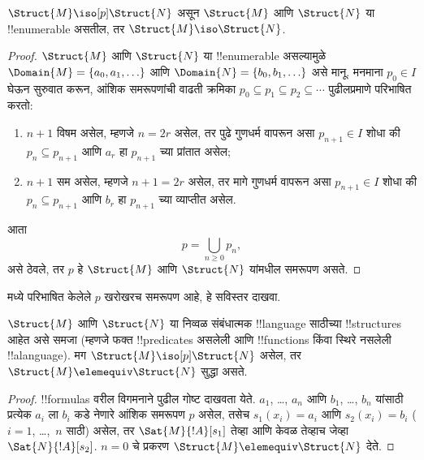 \documentclass[../../../include/open-logic-section]{subfiles}
\begin{document}
\begin{thm}
  $\Struct{M} \iso[p] \Struct{N}$ असून $\Struct{M}$ आणि
  $\Struct{N}$ या !!{enumerable} असतील, तर $\Struct{M} \iso
  \Struct{N}$.
\end{thm}

\begin{proof}
  $\Struct{M}$ आणि $\Struct{N}$ या !!{enumerable} असल्यामुळे
  $\Domain{M} = \{a_0, a_1, \ldots \}$ आणि $\Domain{N} = \{b_0, b_1,
  \ldots \}$ असे मानू. मनमाना $p_0 \in I$ घेऊन सुरुवात करून, आंशिक
  समरूपणांची वाढती क्रमिका $p_0 \subseteq p_1 \subseteq p_2
  \subseteq \cdots$ पुढीलप्रमाणे परिभाषित करतो:
  \begin{enumerate}
  \item $n+1$ विषम असेल, म्हणजे $n = 2r$ असेल, तर पुढे गुणधर्म वापरून
    असा $p_{n+1} \in I$ शोधा की $p_n \subseteq p_{n+1}$
    आणि $a_r$ हा $p_{n+1}$ च्या प्रांतात असेल;
  \item $n+1$ सम असेल, म्हणजे $n+1 =2r$ असेल, तर मागे गुणधर्म वापरून
    असा $p_{n+1} \in I$ शोधा की $p_n \subseteq p_{n+1}$
    आणि $b_r$ हा $p_{n+1}$ च्या व्याप्तीत असेल.
  \end{enumerate}
आता
\[
p = \bigcup_{n\ge 0} p_n,
\]
असे ठेवले, तर $p$ हे $\Struct{M}$ आणि $\Struct{N}$ यांमधील समरूपण
असते.
\end{proof}

\begin{prob}
   मध्ये परिभाषित केलेले $p$ खरोखरच
  समरूपण आहे, हे सविस्तर दाखवा.
\end{prob}

\begin{thm}
  $\Struct{M}$ आणि $\Struct{N}$ या निव्वळ संबंधात्मक !!{language}
  साठीच्या !!{structure}s आहेत असे समजा (म्हणजे फक्त !!{predicate}s
  असलेली आणि !!{function}s किंवा स्थिरे नसलेली !!a{language}). मग
  $\Struct{M} \iso[p] \Struct{N}$ असेल, तर
  $\Struct{M} \elemequiv \Struct{N}$ सुद्धा असते.
\end{thm}

\begin{proof}
  !!{formula}s वरील विगमनाने पुढील गोष्ट दाखवता येते. $a_1$, \dots,
  $a_n$ आणि $b_1$, \dots, $b_n$ यांसाठी प्रत्येक $a_i$ ला $b_i$ कडे
  नेणारे आंशिक समरूपण $p$ असेल, तसेच $s_1(x_i) =a_i$ आणि $s_2(x_i) =b_i$
  ($i =1$, \dots,~$n$ साठी) असेल, तर $\Sat{M}{!A}[s_1]$ तेव्हा आणि
  केवळ तेव्हाच जेव्हा $\Sat{N}{!A}[s_2]$. $n=0$ चे प्रकरण
  $\Struct{M} \elemequiv \Struct{N}$ देते.
\end{proof}
\end{document}
